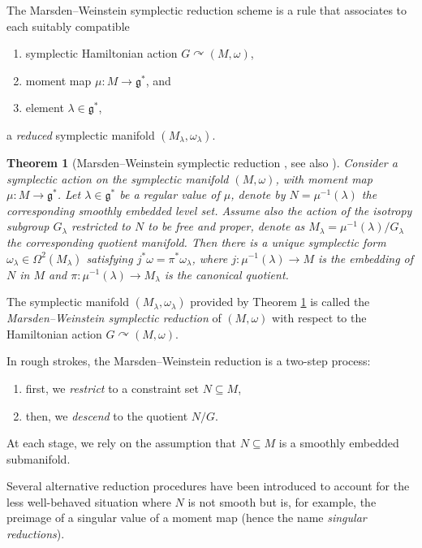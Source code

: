 \documentclass[pdftex]{sigma}
\numberwithin{equation}{section}
\newtheorem{Theorem}{Theorem}[section]
\DeclareMathOperator{\action}{\curvearrowright}
\newcommand{\g}{\mathfrak{g}}
\renewcommand{\subset}{\subseteq}
\begin{document}
The Marsden--Weinstein symplectic reduction scheme is a rule that associates to each suitably compatible{\samepage
\begin{enumerate}\itemsep=0pt
	\item[(i)] symplectic Hamiltonian action $G\curvearrowright(M,\omega)$,
	\item[(ii)] moment map $\mu\colon M\to\g^*$, and
	\item[(iii)] element $\lambda\in\g^*$,
\end{enumerate}
a \emph{reduced} symplectic manifold $(M_\lambda,\omega_\lambda)$.}

\begin{Theorem}[Marsden--Weinstein symplectic reduction \cite{MarsdenWeinstein74}, see also \cite{Meyer73}]\label{thm:MW-red}
 Consider a symplectic action on the symplectic manifold $(M,\omega)$, with moment map  $\mu\colon M\to\g^\ast$.
 Let $\lambda\in\g^*$ be a regular value of $\mu$, denote by $N=\mu^{-1}(\lambda)$ the corresponding smoothly embedded level set.
 Assume also the action of the isotropy subgroup $G_\lambda$ restricted to $N$ to be free and proper, denote as $M_\lambda= \mu^{-1}(\lambda)/G_\lambda$ the corresponding quotient manifold.
 	Then there is a unique symplectic form $\omega_\lambda\in\Omega^{2}(M_\lambda)$ satisfying $j^*\omega = \pi^*\omega_\lambda$, where $j\colon \mu^{-1}(\lambda)\to M$ is the embedding of $N$ in $M$ and $\pi\colon \mu^{-1}(\lambda)\to M_\lambda$ is the canonical quotient.
\end{Theorem}

\begin{Definition}
	The symplectic manifold $(M_\lambda,\omega_\lambda)$ provided by Theorem \ref{thm:MW-red} is called the \emph{Marsden--Weinstein symplectic reduction} of $(M,\omega)$ with respect to the Hamiltonian action $G\action (M,\omega)$.
\end{Definition}

\begin{Remark}
In rough strokes, the Marsden--Weinstein reduction is a two-step process:
\begin{enumerate}\itemsep=0pt
	\item[(i)] first, we \emph{restrict} to a constraint set $N\subset M$,
	\item[(ii)] then, we \emph{descend} to the quotient $N/G$.
\end{enumerate}
At each stage, we rely on the assumption that $N\subset M$ is a smoothly embedded submanifold.

Several alternative reduction procedures have been introduced to account for the less well-behaved situation where $N$ is not smooth but is, for example, the preimage of a singular value of a moment map (hence the name \emph{singular reductions}).
\end{Remark}
\end{document}
